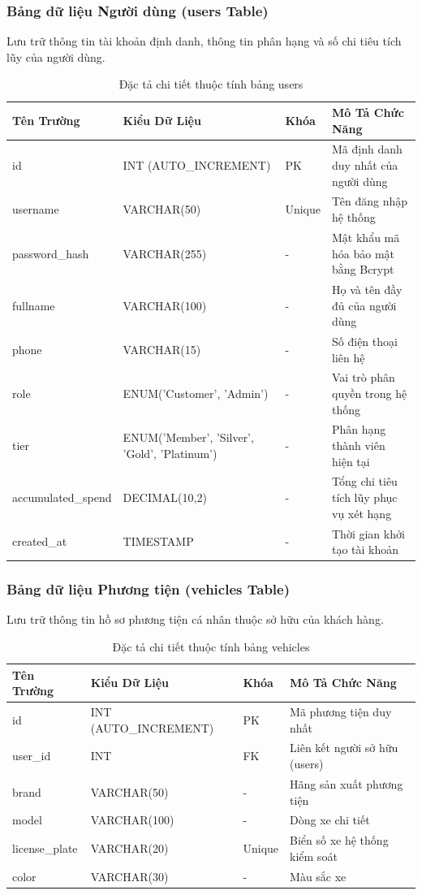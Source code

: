 \subsubsection{Bảng dữ liệu Người dùng (users Table)}
Lưu trữ thông tin tài khoản định danh, thông tin phân hạng và số chi tiêu tích lũy của người dùng.
\begin{table}[htbp]
\centering
\caption{Đặc tả chi tiết thuộc tính bảng users}
\label{tab:users_schema}
\small
\begin{tabular}{p{2.9cm}p{4.2cm}p{1.3cm}p{4.9cm}}
\toprule
\textbf{Tên Trường} & \textbf{Kiểu Dữ Liệu} & \textbf{Khóa} & \textbf{Mô Tả Chức Năng} \\
\midrule
id & INT (AUTO\_INCREMENT) & PK & Mã định danh duy nhất của người dùng \\
username & VARCHAR(50) & Unique & Tên đăng nhập hệ thống \\
password\_hash & VARCHAR(255) & - & Mật khẩu mã hóa bảo mật bằng Bcrypt \\
fullname & VARCHAR(100) & - & Họ và tên đầy đủ của người dùng \\
phone & VARCHAR(15) & - & Số điện thoại liên hệ \\
role & ENUM('Customer', 'Admin') & - & Vai trò phân quyền trong hệ thống \\
tier & ENUM('Member', 'Silver', 'Gold', 'Platinum') & - & Phân hạng thành viên hiện tại \\
accumulated\_spend & DECIMAL(10,2) & - & Tổng chi tiêu tích lũy phục vụ xét hạng \\
created\_at & TIMESTAMP & - & Thời gian khởi tạo tài khoản \\
\bottomrule
\end{tabular}
\end{table}

\subsubsection{Bảng dữ liệu Phương tiện (vehicles Table)}
Lưu trữ thông tin hồ sơ phương tiện cá nhân thuộc sở hữu của khách hàng.
\begin{table}[htbp]
\centering
\caption{Đặc tả chi tiết thuộc tính bảng vehicles}
\label{tab:vehicles_schema}
\small
\begin{tabular}{p{2.9cm}p{4.2cm}p{1.3cm}p{4.9cm}}
\toprule
\textbf{Tên Trường} & \textbf{Kiểu Dữ Liệu} & \textbf{Khóa} & \textbf{Mô Tả Chức Năng} \\
\midrule
id & INT (AUTO\_INCREMENT) & PK & Mã phương tiện duy nhất \\
user\_id & INT & FK & Liên kết người sở hữu (users) \\
brand & VARCHAR(50) & - & Hãng sản xuất phương tiện \\
model & VARCHAR(100) & - & Dòng xe chi tiết \\
license\_plate & VARCHAR(20) & Unique & Biển số xe hệ thống kiểm soát \\
color & VARCHAR(30) & - & Màu sắc xe \\
\bottomrule
\end{tabular}
\end{table}

